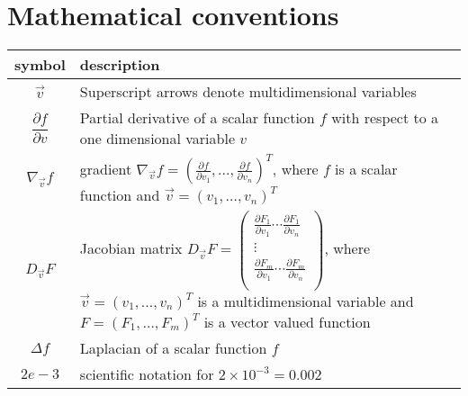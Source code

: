 \section*{Mathematical conventions}

\begin{table}[h!]
\centering
\begin{tabular}{c p{12cm}} %
\hline
symbol & description \\ 
\midrule
$\vec{v}$ & Superscript arrows denote multidimensional variables \\[0.5em] 
$\dfrac{\partial f}{\partial v}$ & Partial derivative of a scalar function $f$ with respect to a one dimensional variable $v$ \\[0.5em] 
$\nabla_{\vec{v}} f$  & gradient $\nabla_{\vec{v}} f = (\frac{\partial f}{\partial v_1}, \ldots, \frac{\partial f}{\partial v_n})^T$, where $f$ is a scalar function and $\vec{v} = (v_1, \ldots, v_n)^T$  \\[0.5em]
$D_{\vec{v}} F$ & Jacobian matrix $D_{\vec{v}} F = \begin{pmatrix}
    \frac{\partial F_1}{\partial v_1} \cdots \frac{\partial F_1}{\partial v_n} \\
    \vdots \\
    \frac{\partial F_m}{\partial v_1} \cdots \frac{\partial F_m}{\partial v_n} \\
\end{pmatrix}$, where $\vec{v} = (v_1, \ldots, v_n)^T$ is a multidimensional variable and $F = (F_1, \ldots, F_m)^T$ is a vector valued function \\
$\Delta f$ & Laplacian of a scalar function $f$ \\ 
$2e-3$ & scientific notation for $2 \times 10^{-3} = 0.002$ \\
\bottomrule
\end{tabular}
\end{table}